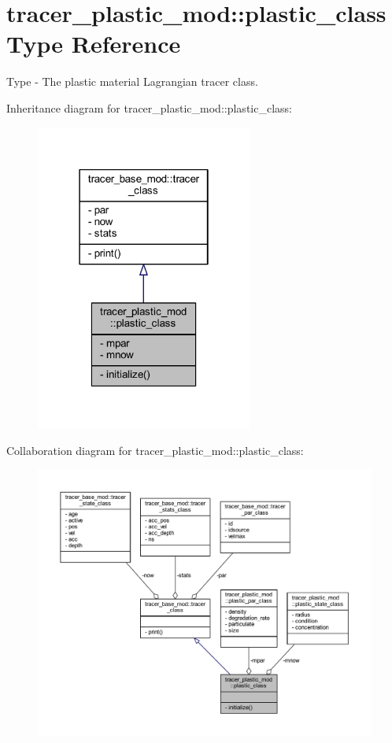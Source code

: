 \hypertarget{structtracer__plastic__mod_1_1plastic__class}{}\section{tracer\+\_\+plastic\+\_\+mod\+:\+:plastic\+\_\+class Type Reference}
\label{structtracer__plastic__mod_1_1plastic__class}


Type -\/ The plastic material Lagrangian tracer class.  




Inheritance diagram for tracer\+\_\+plastic\+\_\+mod\+:\+:plastic\+\_\+class\+:
\nopagebreak
\begin{figure}[H]
\begin{center}
\leavevmode
\includegraphics[width=202pt]{structtracer__plastic__mod_1_1plastic__class__inherit__graph}
\end{center}
\end{figure}


Collaboration diagram for tracer\+\_\+plastic\+\_\+mod\+:\+:plastic\+\_\+class\+:
\nopagebreak
\begin{figure}[H]
\begin{center}
\leavevmode
\includegraphics[width=350pt]{structtracer__plastic__mod_1_1plastic__class__coll__graph}
\end{center}
\end{figure}
